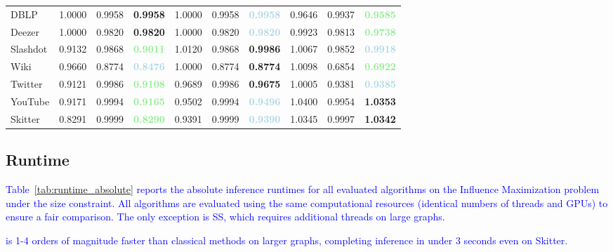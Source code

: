 \begin{table}[h]
\begin{tabular}{l|ccc|ccc|ccc}
DBLP & 1.0000 & 0.9958 & \textbf{\textcolor{lightred}{0.9958}} & 1.0000 & 0.9958 & \textbf{\textcolor{lightblue}{0.9958}} & 0.9646 & 0.9937 & \textbf{\textcolor{lightgreen}{0.9585}} \\
Deezer & 1.0000 & 0.9820 & \textbf{\textcolor{lightred}{0.9820}} & 1.0000 & 0.9820 & \textbf{\textcolor{lightblue}{0.9820}} & 0.9923 & 0.9813 & \textbf{\textcolor{lightgreen}{0.9738}} \\
Slashdot & 0.9132 & 0.9868 & \textbf{\textcolor{lightgreen}{0.9011}} & 1.0120 & 0.9868 & \textbf{\textcolor{lightred}{0.9986}} & 1.0067 & 0.9852 & \textbf{\textcolor{lightblue}{0.9918}} \\
Wiki & 0.9660 & 0.8774 & \textbf{\textcolor{lightblue}{0.8476}} & 1.0000 & 0.8774 & \textbf{\textcolor{lightred}{0.8774}} & 1.0098 & 0.6854 & \textbf{\textcolor{lightgreen}{0.6922}} \\
Twitter & 0.9121 & 0.9986 & \textbf{\textcolor{lightgreen}{0.9108}} & 0.9689 & 0.9986 & \textbf{\textcolor{lightred}{0.9675}} & 1.0005 & 0.9381 & \textbf{\textcolor{lightblue}{0.9385}} \\
YouTube & 0.9171 & 0.9994 & \textbf{\textcolor{lightgreen}{0.9165}} & 0.9502 & 0.9994 & \textbf{\textcolor{lightblue}{0.9496}} & 1.0400 & 0.9954 & \textbf{\textcolor{lightred}{1.0353}} \\
Skitter & 0.8291 & 0.9999 & \textbf{\textcolor{lightgreen}{0.8290}} & 0.9391 & 0.9999 & \textbf{\textcolor{lightblue}{0.9390}} & 1.0345 & 0.9997 & \textbf{\textcolor{lightred}{1.0342}} \\
\midrule
\bottomrule
\end{tabular}

\end{table}

\subsection{Runtime}\label{appendix:runtime}

\textcolor{blue}{Table~\ref{tab:runtime_absolute} reports the absolute inference runtimes for all evaluated algorithms on the Influence Maximization problem under the size constraint. All algorithms are evaluated using the same computational resources (identical numbers of threads and GPUs) to ensure a fair comparison. The only exception is SS, which requires additional threads on large graphs.}

\llm{} \textcolor{blue}{is 1-4 orders of magnitude faster than classical methods on larger graphs, completing inference in under 3 seconds even on Skitter.}

